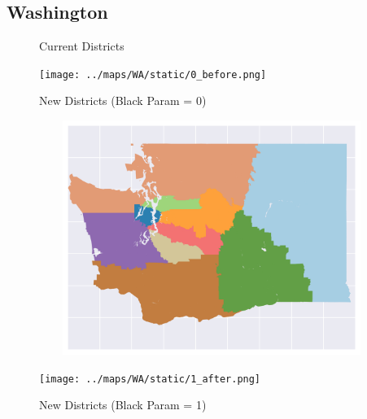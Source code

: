 \subsection{Washington}
\begin{figure}[htb!] \centering
\caption{ Current Districts }
\texttt{[image: ../maps/WA/static/0\_before.png]}
\caption{ New Districts (Black Param = 0) }
\includegraphics[width=5in,height=3in,keepaspectratio]{../maps/WA/static/0_after.png}
\caption{ New Districts (Black Param = 1) }
\texttt{[image: ../maps/WA/static/1\_after.png]}
\end{figure}

\clearpage
\newpage

